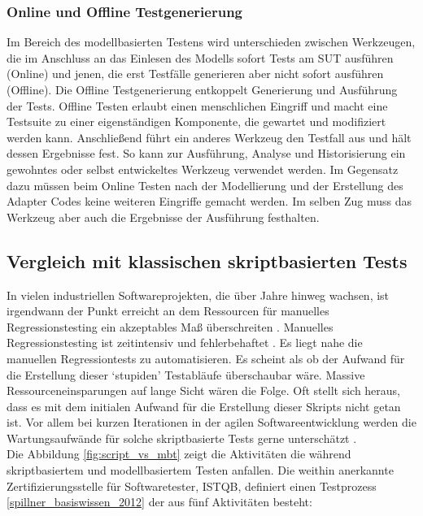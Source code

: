 \subsubsection{Online und Offline Testgenerierung}
\label{sec:online_offline}
Im Bereich des modellbasierten Testens wird unterschieden zwischen Werkzeugen, die im Anschluss an das Einlesen des Modells sofort Tests am \gls{SUT} ausführen (Online) und jenen, die erst Testfälle generieren aber nicht sofort ausführen (Offline). Die Offline Testgenerierung entkoppelt Generierung und Ausführung der Tests. Offline Testen erlaubt einen menschlichen Eingriff und macht eine Testsuite zu einer eigenständigen Komponente, die gewartet und modifiziert werden kann. Anschließend führt ein anderes Werkzeug den Testfall aus und hält dessen Ergebnisse fest. So kann zur Ausführung, Analyse und Historisierung ein gewohntes oder selbst entwickeltes Werkzeug verwendet werden. Im Gegensatz dazu müssen beim Online Testen nach der Modellierung und der Erstellung des Adapter Codes keine weiteren Eingriffe gemacht werden. Im selben Zug muss das Werkzeug aber auch die Ergebnisse der Ausführung festhalten.


\subsection{Vergleich mit klassischen skriptbasierten Tests}
In vielen industriellen Softwareprojekten, die über Jahre hinweg wachsen, ist irgendwann der Punkt erreicht an dem Ressourcen für manuelles Regressionstesting ein akzeptables Maß überschreiten \cite{graham_experiences_2012}. Manuelles Regressionstesting ist zeitintensiv und fehlerbehaftet \cite{utting_practical_2007}. Es liegt nahe die manuellen Regressiontests zu automatisieren. Es scheint als ob der Aufwand für die Erstellung dieser `stupiden' Testabläufe überschaubar wäre. Massive Ressourceneinsparungen auf lange Sicht wären die Folge. Oft stellt sich heraus, dass es mit dem initialen Aufwand für die Erstellung dieser Skripts nicht getan ist. Vor allem bei kurzen Iterationen in der agilen Softwareentwicklung werden die Wartungsaufwände für solche skriptbasierte Tests gerne unterschätzt \cite{graham_experiences_2012}.\\
Die Abbildung \ref{fig:script_vs_mbt} zeigt die Aktivitäten die während skriptbasiertem und modellbasiertem Testen anfallen. Die weithin anerkannte Zertifizierungsstelle für Softwaretester, \Gls{ISTQB}, definiert einen Testprozess \ref{spillner_basiswissen_2012} der aus fünf Aktivitäten besteht: 


